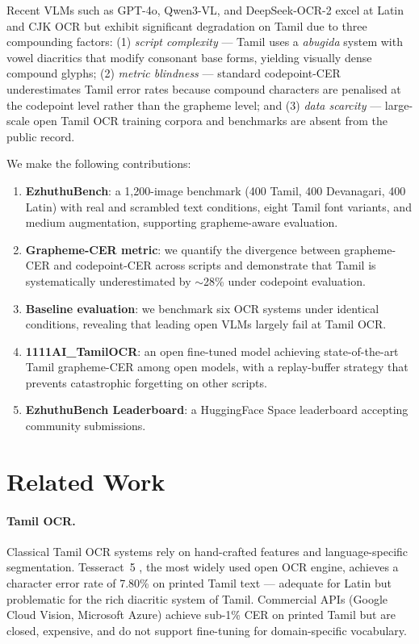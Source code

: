 \documentclass[11pt,a4paper]{article}
\begin{document}
Recent VLMs such as GPT-4o, Qwen3-VL, and DeepSeek-OCR-2 excel at Latin and
CJK OCR but exhibit significant degradation on Tamil due to three compounding
factors:
(1) \emph{script complexity} --- Tamil uses a \textit{abugida} system with
    vowel diacritics that modify consonant base forms, yielding visually
    dense compound glyphs;
(2) \emph{metric blindness} --- standard codepoint-CER underestimates Tamil
    error rates because compound characters are penalised at the codepoint
    level rather than the grapheme level; and
(3) \emph{data scarcity} --- large-scale open Tamil OCR training corpora
    and benchmarks are absent from the public record.

We make the following contributions:
\begin{enumerate}
  \item \textbf{EzhuthuBench}: a 1,200-image benchmark (400 Tamil,
        400 Devanagari, 400 Latin) with real and scrambled text conditions,
        eight Tamil font variants, and medium augmentation, supporting
        grapheme-aware evaluation.
  \item \textbf{Grapheme-CER metric}: we quantify the divergence between
        grapheme-CER and codepoint-CER across scripts and demonstrate that
        Tamil is systematically underestimated by $\sim$28\% under codepoint
        evaluation.
  \item \textbf{Baseline evaluation}: we benchmark six OCR systems under
        identical conditions, revealing that leading open VLMs largely fail
        at Tamil OCR.
  \item \textbf{1111AI\_TamilOCR}: an open fine-tuned model achieving
        state-of-the-art Tamil grapheme-CER among open models, with a
        replay-buffer strategy that prevents catastrophic forgetting on
        other scripts.
  \item \textbf{EzhuthuBench Leaderboard}: a HuggingFace Space leaderboard
        accepting community submissions.
\end{enumerate}

\section{Related Work}

\paragraph{Tamil OCR.}
Classical Tamil OCR systems \citep{cheriet2007character} rely on hand-crafted
features and language-specific segmentation.
Tesseract~5 \citep{smith2007overview}, the most widely used open OCR engine,
achieves a character error rate of 7.80\% on printed Tamil text
\citep{kavitha2024benchmarking} --- adequate for Latin but problematic for
the rich diacritic system of Tamil.
Commercial APIs (Google Cloud Vision, Microsoft Azure) achieve sub-1\% CER
on printed Tamil \citep{kavitha2024benchmarking} but are closed, expensive,
and do not support fine-tuning for domain-specific vocabulary.
\end{document}
